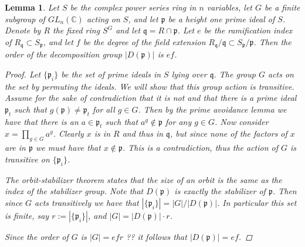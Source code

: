\documentclass[11pt, a4paper, english]{article}
\newtheorem{lemma}[theorem]{Lemma}
\theoremstyle{definition}
\newcommand{\C}{\mathbb{C}}
\begin{document}
\begin{lemma}
Let $S$ be the complex power series ring in $n$ variables, let $G$ be  a finite subgroup of $GL_n(\C)$ acting on $S$, and let $\mathfrak{p}$ be a height one prime ideal of $S$. Denote by $R$ the fixed ring $S^G$ and let $\mathfrak{q} = R \cap \mathfrak{p}$. Let $e$ be the ramification index of $R_\mathfrak{q} \subset S_\mathfrak{p}$, and let $f$ be the degree of the field extension $R_\mathfrak{q}/\mathfrak{q} \subset S_\mathfrak{p}/\mathfrak{p}$. Then the order of the decomposition group $|D(\mathfrak{p})|$ is $ef$.

\begin{proof}
Let $\{ \mathfrak{p}_i \}$ be the set of prime ideals in $S$ lying over $\mathfrak{q}$. The group $G$ acts on the set by permuting the ideals. We will show that this group action is transitive. Assume for the sake of contradiction that it is not and that there is a prime ideal $\mathfrak{p}_t$ such that $g(\mathfrak{p}) \neq \mathfrak{p}_t$ for all $g \in G$. Then by the prime avoidance lemma \cite[Lemma~3.2]{Eis95} we have that there is an $a \in \mathfrak{p}_t$ such that $a^g \not\in \mathfrak{p}$ for any $g \in G$. Now consider $x = \prod_{g \in G} a^g$. Clearly $x$ is in $R$ and thus in $\mathfrak{q}$, but since none of the factors of $x$ are in $\mathfrak{p}$ we must have that $x \not\in \mathfrak{p}$. This is a contradiction, thus the action of $G$ is transitive on $\{ \mathfrak{p}_i \}$.

The orbit-stabilizer theorem states that the size of an orbit is the same as the index of the stabilizer group. Note that $D(\mathfrak{p})$ is exactly the stabilizer of $\mathfrak{p}$. Then since $G$ acts transitively we have that $|\{ \mathfrak{p}_i \}| = |G|/|D(\mathfrak{p})|$. In particular this set is finite, say $r := |\{ \mathfrak{p}_i \}|$, and $|G| = |D(\mathfrak{p})|\cdot r$.

Since the order of $G$ is $|G|=efr$ {\color{red} ??} it follows that $|D(\mathfrak{p})| = ef$.
\end{proof}
\end{lemma}
\end{document}
